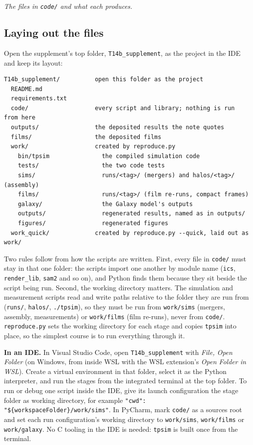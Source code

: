 \documentclass[11pt]{article}
\theoremstyle{definition}
\theoremstyle{plain}
\providecommand{\file}{}\renewcommand{\file}[1]{\texttt{#1}}
\begin{document}
\emph{The files in \file{code/} and what each produces.}

\subsection*{Laying out the files}
\label{c:note.simulations.setting-laying-out-files}
Open the supplement's top folder, \file{T14b\_supplement}, as the project in the IDE and keep its layout:
{ \begin{verbatim}
T14b_supplement/          open this folder as the project
  README.md
  requirements.txt
  code/                   every script and library; nothing is run from here
  outputs/                the deposited results the note quotes
  films/                  the deposited films
  work/                   created by reproduce.py
    bin/tpsim               the compiled simulation code
    tests/                  the two code tests
    sims/                   runs/<tag>/ (mergers) and halos/<tag>/ (assembly)
    films/                  runs/<tag>/ (film re-runs, compact frames)
    galaxy/                 the Galaxy model's outputs
    outputs/                regenerated results, named as in outputs/
    figures/                regenerated figures
  work_quick/             created by reproduce.py --quick, laid out as work/
\end{verbatim}}
Two rules follow from how the scripts are written. First, every file in \file{code/} must stay in that one folder: the scripts import one another by module name (\file{ics}, \file{render\_lib}, \file{sam2} and so on), and Python finds them because they sit beside the script being run. Second, the working directory matters. The simulation and measurement scripts read and write paths relative to the folder they are run from (\file{runs/}, \file{halos/}, \file{./tpsim}), so they must be run from \file{work/sims} (mergers, assembly, measurements) or \file{work/films} (film re-runs), never from \file{code/}. \file{reproduce.py} sets the working directory for each stage and copies \file{tpsim} into place, so the simplest course is to run everything through it.

\label{c:note.simulations.setting-laying-out-files-2}
\textbf{In an IDE.} In Visual Studio Code, open \file{T14b\_supplement} with \emph{File, Open Folder} (on Windows, from inside WSL with the WSL extension's \emph{Open Folder in WSL}). Create a virtual environment in that folder, select it as the Python interpreter, and run the stages from the integrated terminal at the top folder. To run or debug one script inside the IDE, give its launch configuration the stage folder as working directory, for example \texttt{"cwd": "\$\{workspaceFolder\}/work/sims"}. In PyCharm, mark \file{code/} as a sources root and set each run configuration's working directory to \file{work/sims}, \file{work/films} or \file{work/galaxy}. No C tooling in the IDE is needed: \file{tpsim} is built once from the terminal.
\end{document}
